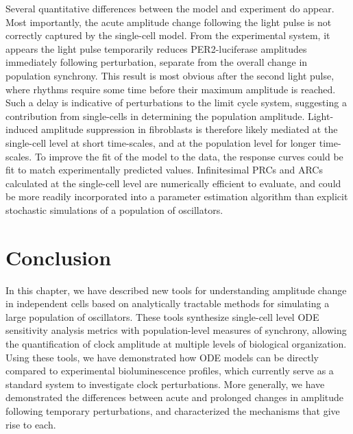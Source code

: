 Several quantitative differences between the model and experiment do appear.
Most importantly, the acute amplitude change following the light pulse is not correctly captured by the single-cell model.
From the experimental system, it appears the light pulse temporarily reduces PER2-luciferase amplitudes immediately following perturbation, separate from the overall change in population synchrony.
This result is most obvious after the second light pulse, where rhythms require some time before their maximum amplitude is reached.
Such a delay is indicative of perturbations to the limit cycle system, suggesting a contribution from single-cells in determining the population amplitude.
Light-induced amplitude suppression in fibroblasts is therefore likely mediated at the single-cell level at short time-scales, and at the population level for longer time-scales.
To improve the fit of the model to the data, the response curves could be fit to match experimentally predicted values.
Infinitesimal PRCs and ARCs calculated at the single-cell level are numerically efficient to evaluate, and could be more readily incorporated into a parameter estimation algorithm than explicit stochastic simulations of a population of oscillators.

\section{Conclusion}

In this chapter, we have described new tools for understanding amplitude change in independent cells based on analytically tractable methods for simulating a large population of oscillators.
These tools synthesize single-cell level ODE sensitivity analysis metrics with population-level measures of synchrony, allowing the quantification of clock amplitude at multiple levels of biological organization.
Using these tools, we have demonstrated how ODE models can be directly compared to experimental bioluminescence profiles, which currently serve as a standard system to investigate clock perturbations.
More generally, we have demonstrated the differences between acute and prolonged changes in amplitude following temporary perturbations, and characterized the mechanisms that give rise to each.

